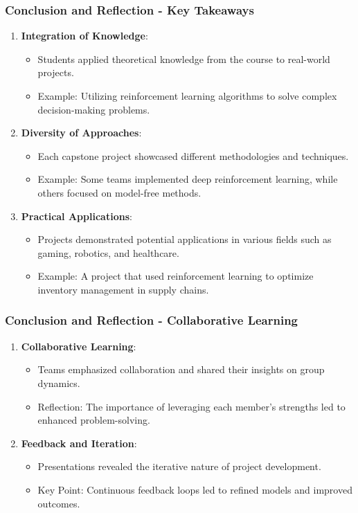 \documentclass{beamer}
\begin{document}
\begin{frame}[fragile]
    \frametitle{Conclusion and Reflection - Key Takeaways}
    \begin{enumerate}
        \item \textbf{Integration of Knowledge}:
        \begin{itemize}
            \item Students applied theoretical knowledge from the course to real-world projects.
            \item Example: Utilizing reinforcement learning algorithms to solve complex decision-making problems.
        \end{itemize}

        \item \textbf{Diversity of Approaches}:
        \begin{itemize}
            \item Each capstone project showcased different methodologies and techniques.
            \item Example: Some teams implemented deep reinforcement learning, while others focused on model-free methods.
        \end{itemize}

        \item \textbf{Practical Applications}:
        \begin{itemize}
            \item Projects demonstrated potential applications in various fields such as gaming, robotics, and healthcare.
            \item Example: A project that used reinforcement learning to optimize inventory management in supply chains.
        \end{itemize}
    \end{enumerate}
\end{frame}

\begin{frame}[fragile]
    \frametitle{Conclusion and Reflection - Collaborative Learning}
    \begin{enumerate}[resume]
        \item \textbf{Collaborative Learning}:
        \begin{itemize}
            \item Teams emphasized collaboration and shared their insights on group dynamics.
            \item Reflection: The importance of leveraging each member's strengths led to enhanced problem-solving.
        \end{itemize}

        \item \textbf{Feedback and Iteration}:
        \begin{itemize}
            \item Presentations revealed the iterative nature of project development.
            \item Key Point: Continuous feedback loops led to refined models and improved outcomes.
        \end{itemize}
    \end{enumerate}
\end{frame}
\end{document}
